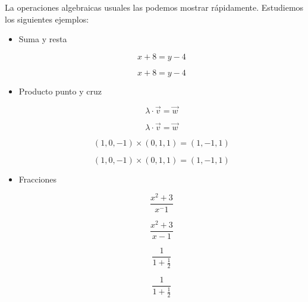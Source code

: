 \documentclass[graybox,envcountchap,sectrefs]{svmono}
\begin{document}
    La operaciones algebraicas usuales las podemos mostrar rápidamente. Estudiemos los siguientes ejemplos:
    \begin{itemize}
        \item Suma y resta
    \begin{tcbraster}[raster columns=2, raster equal height]
    \begin{code}
        \[ x + 8 = y - 4 \]
    \end{code}
    \begin{compiled}
        \[ x + 8 = y - 4 \]
    \end{compiled}
\end{tcbraster}

    \item Producto punto y cruz
    \begin{tcbraster}[raster columns=2, raster equal height]
    \begin{code}
        \[ \lambda \cdot \vec{v} = \vec{w} \]
    \end{code}
    \begin{compiled}
        \[ \lambda \cdot \vec{v} = \vec{w} \]
    \end{compiled}
\end{tcbraster}

    \begin{tcbraster}[raster columns=2, raster equal height]
    \begin{code}
        \[ (1,0,-1)\times (0,1,1) = (1,-1,1) \]
    \end{code}
    \begin{compiled}
        \[ (1,0,-1)\times (0,1,1) = (1,-1,1) \]
    \end{compiled}
\end{tcbraster}

    \item Fracciones
 \begin{tcbraster}[raster columns=2, raster equal height]
    \begin{code}
        \[ \frac{x^2 + 3}{x^-1}\]
    \end{code}
    \begin{compiled}
        \[ \frac{x^2 + 3}{x-1}\]
    \end{compiled}
\end{tcbraster}

 \begin{tcbraster}[raster columns=2, raster equal height]
    \begin{code}
        \[\frac{1}{1+ \frac{1}{2} }\]
    \end{code}
    \begin{compiled}
        \[ \frac{1}{1+\frac{1}{2}} \]
    \end{compiled}
\end{tcbraster}
    \end{itemize}
\end{document}
